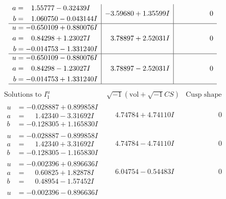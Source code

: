 \documentclass[1p]{elsarticle_modified}
\theoremstyle{definition}
\newcommand{\I}{\sqrt{-1}}
\begin{document}
$$\begin{array}{c|c|c}
\begin{aligned}
a &= \phantom{-}1.55777 - 0.32439 I \\
b &= \phantom{-}1.060750 - 0.043144 I\end{aligned}
 & -3.59680 + 1.35599 I & \phantom{-0.000000 } 0 \\ \hline\begin{aligned}
u &= -0.650109 + 0.880076 I \\
a &= \phantom{-}0.84298 + 1.23027 I \\
b &= -0.014753 - 1.331240 I\end{aligned}
 & \phantom{-}3.78897 + 2.52031 I & \phantom{-0.000000 } 0 \\ \hline\begin{aligned}
u &= -0.650109 - 0.880076 I \\
a &= \phantom{-}0.84298 - 1.23027 I \\
b &= -0.014753 + 1.331240 I\end{aligned}
 & \phantom{-}3.78897 - 2.52031 I & \phantom{-0.000000 } 0\\
 \hline 
 \end{array}$$\newpage$$\begin{array}{c|c|c}  
\text{Solutions to }I^u_{1}& \I (\text{vol} + \sqrt{-1}CS) & \text{Cusp shape}\\
 \hline 
\begin{aligned}
u &= -0.028887 + 0.899858 I \\
a &= \phantom{-}1.42340 - 3.31692 I \\
b &= -0.128305 + 1.165830 I\end{aligned}
 & \phantom{-}4.74784 + 4.74110 I & \phantom{-0.000000 } 0 \\ \hline\begin{aligned}
u &= -0.028887 - 0.899858 I \\
a &= \phantom{-}1.42340 + 3.31692 I \\
b &= -0.128305 - 1.165830 I\end{aligned}
 & \phantom{-}4.74784 - 4.74110 I & \phantom{-0.000000 } 0 \\ \hline\begin{aligned}
u &= -0.002396 + 0.896636 I \\
a &= \phantom{-}0.60825 + 1.82878 I \\
b &= \phantom{-}0.48954 - 1.57452 I\end{aligned}
 & \phantom{-}6.04754 - 0.54483 I & \phantom{-0.000000 } 0 \\ \hline\begin{aligned}
u &= -0.002396 - 0.896636 I \\

\end{aligned}
\end{array}$$
\end{document}
